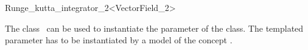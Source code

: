 

\begin{ccRefFunctionObjectClass}{Runge_kutta_integrator_2<VectorField_2>}  %

\ccDefinition
  
The class \ccRefName\ can be used to instantiate the  parameter of
the  class.
The templated parameter  has to
be instantiated by a model of the concept .



\ccIsModel 

 \\

\ccSeeAlso
{} \\
\end{ccRefFunctionObjectClass}


